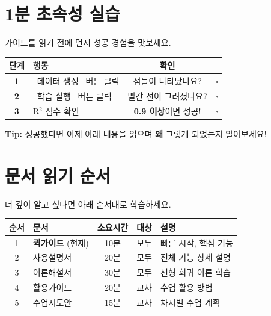 \documentclass[11pt, a4paper]{article}
\begin{document}
\section{1분 초속성 실습}

\begin{successbox}[지금 바로 해보세요!]
가이드를 읽기 전에 먼저 성공 경험을 맛보세요.
\end{successbox}

\vspace{0.5cm}

\begin{center}
\begin{tabular}{clcc}
    \toprule
    \textbf{단계} & \textbf{행동} & \textbf{확인} & \\
    \midrule
    \textbf{1} & \colorbox{mainblue}{\color{white}\small\ 데이터 생성\ } 버튼 클릭 & 점들이 나타났나요? & $\square$ \\[3pt]
    \textbf{2} & \colorbox{applegreen}{\color{white}\small\ 학습 실행\ } 버튼 클릭 & 빨간 선이 그려졌나요? & $\square$ \\[3pt]
    \textbf{3} & R$^2$ 점수 확인 & \textbf{0.9 이상}이면 성공! & $\square$ \\
    \bottomrule
\end{tabular}
\end{center}

\vspace{0.5cm}

\begin{tipbox}
\textbf{Tip:} 성공했다면 이제 아래 내용을 읽으며 \textbf{왜} 그렇게 되었는지 알아보세요!
\end{tipbox}

\section{문서 읽기 순서}

더 깊이 알고 싶다면 아래 순서대로 학습하세요.

\vspace{0.3cm}

\begin{center}
\begin{tabular}{clccl}
    \toprule
    \textbf{순서} & \textbf{문서} & \textbf{소요시간} & \textbf{대상} & \textbf{설명} \\
    \midrule
    1 & \textbf{퀵가이드} (현재) & 10분 & 모두 & 빠른 시작, 핵심 기능 \\
    2 & 사용설명서 & 20분 & 모두 & 전체 기능 상세 설명 \\
    3 & 이론해설서 & 30분 & 모두 & 선형 회귀 이론 학습 \\
    4 & 활용가이드 & 20분 & 교사 & 수업 활용 방법 \\
    5 & 수업지도안 & 15분 & 교사 & 차시별 수업 계획 \\
    \bottomrule
\end{tabular}
\end{center}
\end{document}
